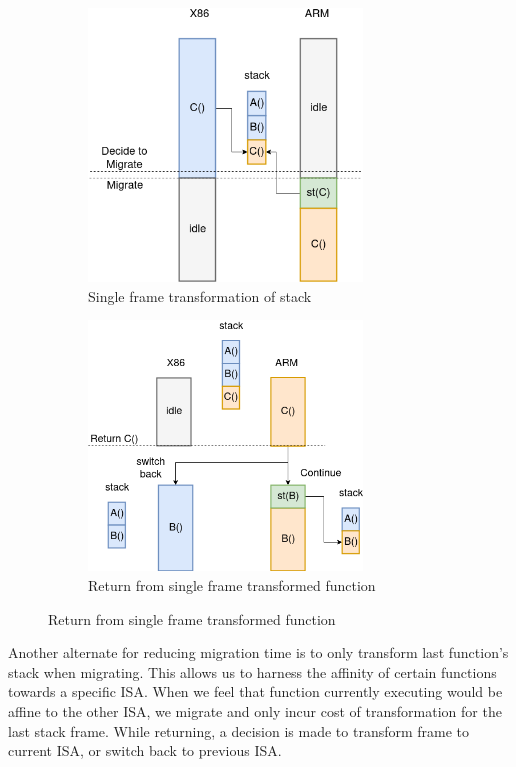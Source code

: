 \documentclass[a4paper]{article}
\begin{document}
\begin{figure}[H]
\begin{subfigure}{0.5\textwidth}
\includegraphics[width=0.8\textwidth]{singleframe_trans}
\caption{\label{fig:singleframe_trans}Single frame transformation of stack}
\end{subfigure}
\begin{subfigure}{0.5\textwidth}
\includegraphics[width=0.8\textwidth]{singleframe_return}
\caption{\label{fig:singleframe_trans}Return from single frame transformed function}
\end{subfigure}
\end{figure}

Another alternate for reducing migration time is to only transform last function's stack when migrating. This allows us to harness the affinity of certain functions towards a specific ISA. When we feel that function currently executing would be affine to the other ISA, we migrate and only incur cost of transformation for the last stack frame. While returning, a decision is made to transform frame to current ISA, or switch back to previous ISA.
\end{document}
